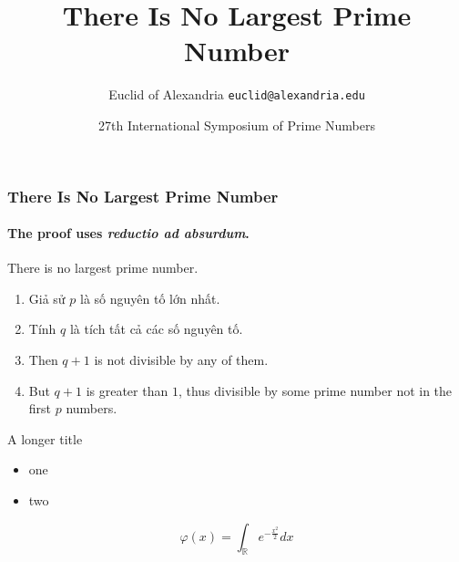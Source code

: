 \documentclass{beamer}
\title{There Is No Largest Prime Number}
\date[ISPN ’80]{27th International Symposium of Prime Numbers}
\author[Euclid]{Euclid of Alexandria \texttt{euclid@alexandria.edu}}
\begin{document}
\begin{frame}
\titlepage
\end{frame}


\begin{frame} 
\frametitle{There Is No Largest Prime Number} 
\framesubtitle{The proof uses \textit{reductio ad absurdum}.} 
\begin{theorem}
There is no largest prime number. \end{theorem} 
\begin{enumerate} 
\item<1-> Giả sử $p$ là số nguyên tố lớn nhất. 
\item<2-> Tính $q$ là tích tất cả các số nguyên tố. 
\item<3-> Then $q+1$ is not divisible by any of them. 
\item<4-> But $q + 1$ is greater than $1$, thus divisible by some prime
number not in the first $p$ numbers.
\end{enumerate}
\end{frame}

\begin{frame}{A longer title}
\begin{itemize}
\item one
\item two
\end{itemize}
\end{frame}

\begin{frame}
    \begin{equation}
        \varphi(x) = \int_{\mathbb{R}}e^{-\frac{x^2}{2}} dx
    \end{equation}
\end{frame}
\end{document}
